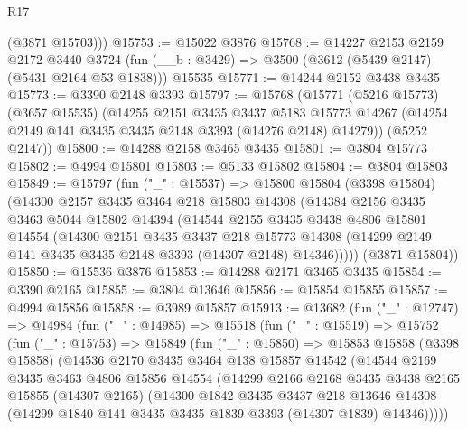 \begin{lexlean}{R17}
\begin{coremodule}
        (@3871 @15703)))
@15753 := @15022 @3876
@15768 := @14227
    @2153
    @2159
    @2172
    @3440
    @3724
    (fun (__b : @3429) => @3500 (@3612 (@5439 @2147) (@5431 @2164 @53 @1838)))
    @15535
@15771 := @14244 @2152 @3438 @3435
@15773 := @3390 @2148 @3393
@15797 := @15768
    (@15771
      (@5216 @15773)
      (@3657 @15535)
      (@14255
        @2151
        @3435
        @3437
        @5183
        @15773
        @14267
        (@14254 @2149 @141 @3435 @3435 @2148 @3393 (@14276 @2148) @14279))
      (@5252 @2147))
@15800 := @14288 @2158 @3465 @3435
@15801 := @3804 @15773
@15802 := @4994 @15801
@15803 := @5133 @15802
@15804 := @3804 @15803
@15849 := @15797
    (fun ("_" : @15537) =>
    @15800
      @15804
      (@3398 @15804)
      (@14300
        @2157
        @3435
        @3464
        @218
        @15803
        @14308
        (@14384
          @2156
          @3435
          @3463
          @5044
          @15802
          @14394
          (@14544
            @2155
            @3435
            @3438
            @4806
            @15801
            @14554
            (@14300
              @2151
              @3435
              @3437
              @218
              @15773
              @14308
              (@14299 @2149 @141 @3435 @3435 @2148 @3393 (@14307 @2148) @14346)))))
      (@3871 @15804))
@15850 := @15536 @3876
@15853 := @14288 @2171 @3465 @3435
@15854 := @3390 @2165
@15855 := @3804 @13646
@15856 := @15854 @15855
@15857 := @4994 @15856
@15858 := @3989 @15857
@15913 := @13682
    (fun ("_" : @12747) =>
    @14984
      (fun ("_" : @14985) =>
      @15518
        (fun ("_" : @15519) =>
        @15752
          (fun ("_" : @15753) =>
          @15849
            (fun ("_" : @15850) =>
            @15853
              @15858
              (@3398 @15858)
              (@14536
                @2170
                @3435
                @3464
                @138
                @15857
                @14542
                (@14544
                  @2169
                  @3435
                  @3463
                  @4806
                  @15856
                  @14554
                  (@14299
                    @2166
                    @2168
                    @3435
                    @3438
                    @2165
                    @15855
                    (@14307 @2165)
                    (@14300
                      @1842
                      @3435
                      @3437
                      @218
                      @13646
                      @14308
                      (@14299 @1840 @141 @3435 @3435 @1839 @3393 (@14307 @1839) @14346)))))

\end{coremodule}
\end{lexlean}
